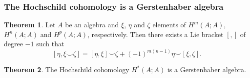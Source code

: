 \documentclass{beamer}
\theoremstyle{definition}
\newtheorem{teorema}{Theorem}
\newtheorem{defi}{Definition}
\begin{document}
\begin{frame}
	\frametitle{The Hochschild cohomology is a Gerstenhaber algebra}
	
	\begin{teorema}
		Let $A$ be an algebra and $\xi$, $\eta$ and $\zeta$ elements of $H^m(A;A)$, $H^n(A;A)$ and $H^p(A;A)$, respectively. Then there exists a Lie bracket $[,]$ of degree $-1$ such that
		\[
		[\eta, \xi\smile \zeta]=[\eta,\xi]\smile \zeta+(-1)^{m(n-1)}\eta\smile[\xi,\zeta].
		\]
	\end{teorema}\pause
	\begin{teorema}
	The Hochschild cohomology $H^*(A;A)$ is a Gerstenhaber algebra.
\end{teorema} 
\end{frame}

%	
%
\end{document}
